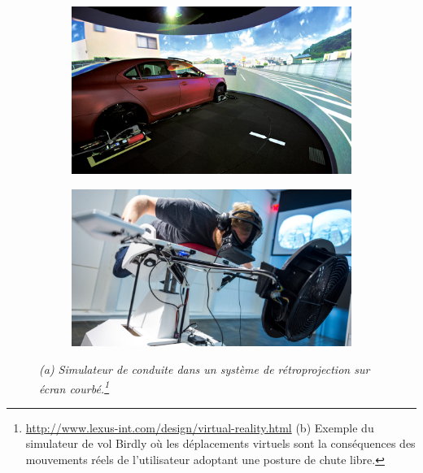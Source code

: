 \begin{figure}[h]
  \begin{subfigure}{.5\textwidth}
  \centering
  {\includegraphics[width=0.9\linewidth]{./figures/ch2/driving_simu}}
    \caption{}
    \label{Fig:driving_simu}
  \end{subfigure}
  \begin{subfigure}{.5\textwidth}
  \centering
  {\includegraphics[width=0.9\linewidth]{./figures/ch2/flight_simu}}
    \caption{}
    \label{Fig:flight_simu}
  \hspace{0.3cm}
  \end{subfigure}
  \caption[(a) Exemple d'un simulateur de vol. (b) Exemple d'un simulateur de conduite.]{\it(a) Simulateur de conduite dans un système de rétroprojection sur écran courbé.\footnote{\url{http://www.lexus-int.com/design/virtual-reality.html}
  (b) Exemple du simulateur de vol Birdly où les déplacements virtuels sont la conséquences des mouvements réels de l'utilisateur adoptant une posture de chute libre.}
  }
\end{figure}


